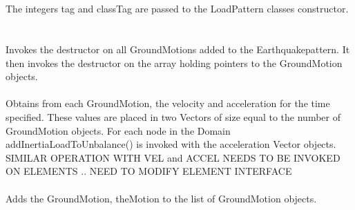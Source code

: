  \\ 
\\ 
The integers \p tag and \p classTag are passed to the
LoadPattern classes constructor. \\

 \\
\\ 
Invokes the destructor on all GroundMotions added to the
Earthquakepattern. It then invokes the destructor on the array holding
pointers to the GroundMotion objects.\\

 \\ 
Obtains from each GroundMotion, the velocity and acceleration for the
time specified. These values are placed in two Vectors of size equal
to the number of GroundMotion objects. For each node in the Domain
addInertiaLoadToUnbalance() is invoked with the acceleration Vector
objects. SIMILAR OPERATION WITH VEL and ACCEL NEEDS TO BE INVOKED ON
ELEMENTS .. NEED TO MODIFY ELEMENT INTERFACE \\

 \\
Adds the GroundMotion, \p theMotion to the list of GroundMotion
objects. \\
